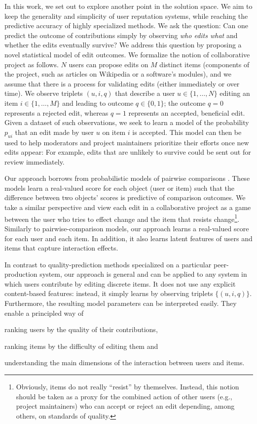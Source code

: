 In this work, we set out to explore another point in the solution space.
We aim to keep the generality and simplicity of user reputation systems, while reaching the predictive accuracy of highly specialized methods.
We ask the question:
Can one predict the outcome of contributions simply by observing \emph{who edits what} and whether the edits eventually survive?
We address this question by proposing a novel statistical model of edit outcomes.
We formalize the notion of collaborative project as follows.
$N$ users can propose edits on $M$ distinct items (components of the project, such as articles on Wikipedia or a software's modules), and we assume that there is a process for validating edits (either immediately or over time).
We observe triplets $(u, i, q)$ that describe a user $u \in \{1, \ldots, N\}$ editing an item $i \in \{1, \ldots, M\}$ and leading to outcome $q \in \{0, 1\}$;
the outcome $q = 0$ represents a rejected edit, whereas $q = 1$ represents an accepted, beneficial edit.
Given a dataset of such observations, we seek to learn a model of the probability $p_{ui}$ that an edit made by user $u$ on item $i$ is accepted.
This model can then be used to help moderators and project maintainers prioritize their efforts once new edits appear:
For example, edits that are unlikely to survive could be sent out for review immediately.

Our approach borrows from probabilistic models of pairwise comparisons \citep{zermelo1928berechnung, rasch1960probabilistic}.
These models learn a real-valued score for each object (user or item) such that the difference between two objects' scores is predictive of comparison outcomes.
We take a similar perspective and view each edit in a collaborative project as a game between the user who tries to effect change and the item that resists change\footnote{Obviously, items do not really ``resist'' by themselves. Instead, this notion should be taken as a proxy for the combined action of other users (e.g., project maintainers) who can accept or reject an edit depending, among others, on standards of quality.}.
Similarly to pairwise-comparison models, our approach learns a real-valued score for each user and each item.
In addition, it also learns latent features of users and items that capture interaction effects.

In contrast to quality-prediction methods specialized on a particular peer-production system, our approach is general and can be applied to any system in which users contribute by editing discrete items.
It does not use any explicit content-based features: instead, it simply learns by observing triplets $\{ (u, i, q) \}$.
Furthermore, the resulting model parameters can be interpreted easily.
They enable a principled way of
\begin{enuminline}
	\item ranking users by the quality of their contributions,
	\item ranking items by the difficulty of editing them and
	\item understanding the main dimensions of the interaction between users and items.
\end{enuminline}

